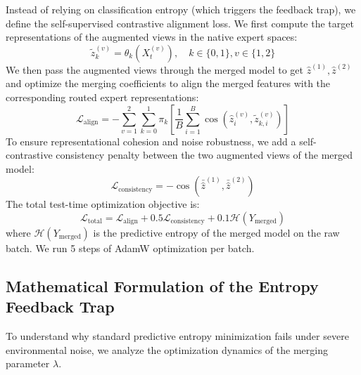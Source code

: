 \documentclass{article}
\theoremstyle{plain}
\theoremstyle{definition}
\theoremstyle{remark}
\begin{document}
Instead of relying on classification entropy (which triggers the feedback trap), we define the self-supervised contrastive alignment loss. We first compute the target representations of the augmented views in the native expert spaces:
\begin{equation}
    \tilde{z}_{k}^{(v)} = \theta_k(X_t^{(v)}), \quad k \in \{0, 1\}, v \in \{1, 2\}
\end{equation}
We then pass the augmented views through the merged model to get $\hat{z}^{(1)}, \hat{z}^{(2)}$ and optimize the merging coefficients to align the merged features with the corresponding routed expert representations:
\begin{equation}
    \mathcal{L}_{\text{align}} = - \sum_{v=1}^2 \sum_{k=0}^1 \pi_k \left[ \frac{1}{B} \sum_{i=1}^B \cos\left( \hat{z}_{i}^{(v)}, \tilde{z}_{k, i}^{(v)} \right) \right]
\end{equation}
To ensure representational cohesion and noise robustness, we add a self-contrastive consistency penalty between the two augmented views of the merged model:
\begin{equation}
    \mathcal{L}_{\text{consistency}} = - \cos\left( \bar{\hat{z}}^{(1)}, \bar{\hat{z}}^{(2)} \right)
\end{equation}
The total test-time optimization objective is:
\begin{equation}
    \mathcal{L}_{\text{total}} = \mathcal{L}_{\text{align}} + 0.5 \mathcal{L}_{\text{consistency}} + 0.1 \mathcal{H}(Y_{\text{merged}})
\end{equation}
where $\mathcal{H}(Y_{\text{merged}})$ is the predictive entropy of the merged model on the raw batch. We run 5 steps of AdamW optimization per batch.

\subsection{Mathematical Formulation of the Entropy Feedback Trap}
To understand why standard predictive entropy minimization fails under severe environmental noise, we analyze the optimization dynamics of the merging parameter $\lambda$.
\end{document}
